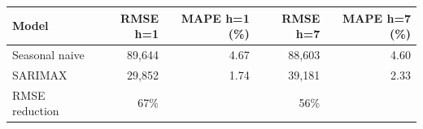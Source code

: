 \begin{tabular}{lrrrr}
\toprule
Model & RMSE h=1 & MAPE h=1 (\%) & RMSE h=7 & MAPE h=7 (\%) \\
\midrule
Seasonal naive & 89,644 & 4.67 & 88,603 & 4.60 \\
SARIMAX & 29,852 & 1.74 & 39,181 & 2.33 \\
RMSE reduction & 67\% &  & 56\% &  \\
\bottomrule
\end{tabular}
